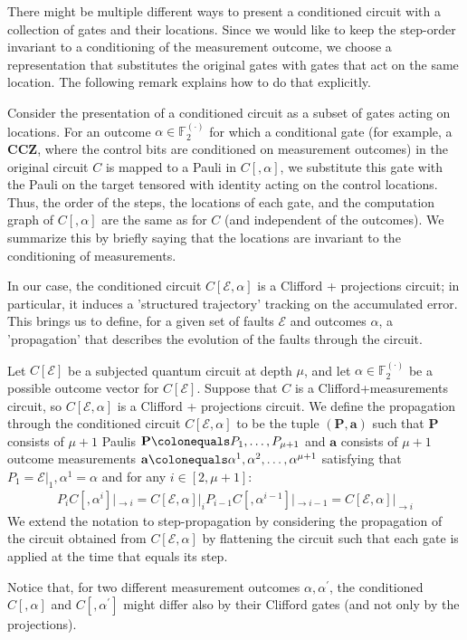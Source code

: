 There might be multiple different ways to present a conditioned circuit with a collection of gates and their locations. Since we would like to keep the step-order invariant to a conditioning of the measurement outcome, we choose a representation that substitutes the original gates with gates that act on the same location. The following remark explains how to do that explicitly.
\begin{remark}
  \label{remark:condmeas}
  Consider the presentation of a conditioned circuit as a subset of gates acting on locations. For an outcome $\alpha \in \mathbb{F}_{2}^{(\cdot)}$ for which a conditional gate (for example, a $\mathbf{CCZ}$, where the control bits are conditioned on measurement outcomes) in the original circuit $C$ is mapped to a Pauli in $C[,\alpha]$, we substitute this gate with the Pauli on the target tensored with identity acting on the control locations. Thus, the order of the steps, the locations of each gate, and the computation graph of $C[,\alpha]$ are the same as for $C$ (and independent of the outcomes). We summarize this by briefly saying that the locations are invariant to the conditioning of measurements. 
\end{remark}

In our case, the conditioned circuit $C[\mathcal{E}, \alpha]$ is a Clifford + projections circuit; in particular, it induces a 'structured trajectory' tracking on the accumulated error. This brings us to define, for a given set of faults $\mathcal{E}$ and outcomes $\alpha$, a 'propagation' that describes the evolution of the faults through the circuit.
\begin{definition}[Propagation]
  \label{def:propagation}
Let $C[\mathcal{E}]$ be a subjected quantum circuit at depth $\mu$, and let $\alpha \in \mathbb{F}_{2}^{(\cdot)}$ be a possible outcome vector for $C[\mathcal{E}]$. Suppose that $C$ is a Clifford+measurements circuit, so $C[\mathcal{E},\alpha]$ is a Clifford + projections circuit. We define the propagation through the conditioned circuit $C[\mathcal{E},\alpha]$ to be the tuple $(\mathbf{P},\mathbf{a})$ such that $\mathbf{P}$ consists of $\mu+1$ Paulis $\mathbf{P} \colonequals P_{1}, \ldots, P_{\mu+1}$ and $\mathbf{a}$ consists of $\mu+1$ outcome measurements $\mathbf{a} \colonequals \alpha^{1}, \alpha^{2}, \ldots, \alpha^{\mu+1}$ satisfying that $P_{1} = \mathcal{E}|_{1}, \alpha^{1}=\alpha$ and for any $i \in [2, \mu+1]$:
  \begin{equation*}
    \begin{split}
      P_{i}C[,\alpha^{i}]|_{\rightarrow i} =  C[\mathcal{E},\alpha]|_{ i} P_{i-1} C[,\alpha^{i-1}]|_{\rightarrow i-1} = C[\mathcal{E},\alpha]|_{\rightarrow i}
    \end{split}
  \end{equation*}
We extend the notation to step-propagation by considering the propagation of the circuit obtained from $C[\mathcal{E},\alpha]$ by flattening the circuit such that each gate is applied at the time that equals its step. 
\end{definition}

\begin{remark}
Notice that, for two different measurement outcomes $\alpha,\alpha^{\prime}$, the conditioned $C[,\alpha]$ and $C[,\alpha^{\prime}]$ might differ also by their Clifford gates (and not only by the projections).
\end{remark}



